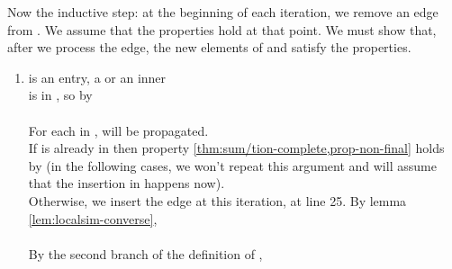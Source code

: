 \documentclass{LMCS}
\theoremstyle{definition} \newtheorem{property}[thm]{Property}
\begin{document}
Now the inductive step: at the beginning of each iteration, we remove an edge
 from \work{}.
We assume that the properties hold at that point.
We must show that, after we process the edge, the new elements of \seen{} and 
\finals{} satisfy the properties.
\begin{enumerate}[]
\item 
  \lstatw{} is an entry, a \dlcapply{} or an inner \dlceval \\
   is in \seen, so by \ih \\
   \\
  For each \lstath{} in \succ{\lstatw},  will be propagated.
  \\
  If  is already in \seen{} then property 
  \ref{thm:sum/tion-complete,prop-non-final} holds by \ih{}
  (in the following cases, we won't repeat this argument and will assume that
  the insertion in \seen{} happens now).
  \\
  Otherwise, we insert the edge at this iteration, at line 25.
  By lemma \ref{lem:localsim-converse}, \\
   \\
  By the second branch of the definition of \dcoren{},
  

\end{enumerate}
\end{document}
